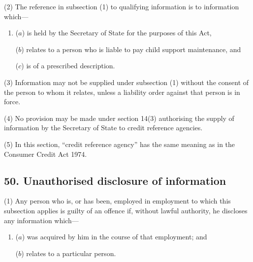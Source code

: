 \documentclass[12pt,a4paper]{article}
\begin{document}
(2) The reference in subsection (1) to qualifying information is to information which—
\begin{enumerate}\item[]
($a$) is held by the 
Secretary of State  %
for the purposes of this Act,

($b$) relates to a person who is liable to pay child support maintenance, and

($c$) is of a prescribed description.
\end{enumerate}

(3) Information may not be supplied under subsection (1) without the consent of the person to whom it relates, unless a liability order against that person is in force.

(4) No provision may be made under section 14(3) authorising the supply of information by the 
Secretary of State  %
to credit reference agencies.

(5) In this section, “credit reference agency” has the same meaning as in the Consumer Credit Act 1974.


\subsection{50. Unauthorised disclosure of information}

(1) Any person who is, or has been, employed in employment to which 
this subsection  %
applies is guilty of an offence if, without lawful authority, he discloses any information which—
\begin{enumerate}\item[]
($a$) was acquired by him in the course of that employment; and

($b$) relates to a particular person.
\end{enumerate}
\end{document}
